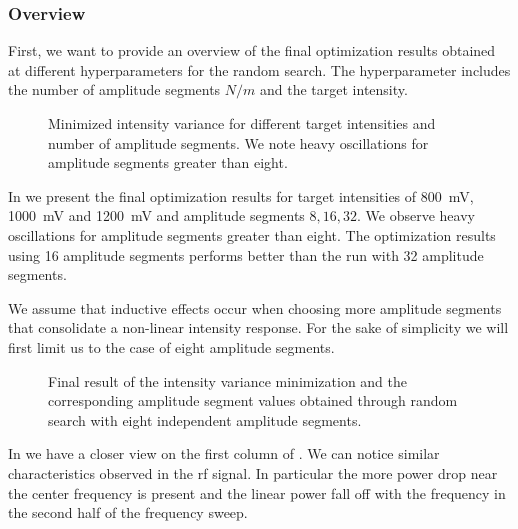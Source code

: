 \subsubsection{Overview}

First, we want to provide an overview of the final optimization results
obtained at different hyperparameters for the random search. The
hyperparameter includes the number of amplitude segments $N/m$ and the target
intensity.
\begin{figure}[htb]
  \centering
  \begin{adjustbox}{width=\textwidth}
  \end{adjustbox}
  \caption{Minimized intensity variance for different target intensities
    and number of amplitude segments. We note heavy oscillations for
    amplitude segments greater than eight.
  }\label{fig:intensity_optimization_overview}
\end{figure}
In  we present the final
optimization results for target intensities of \SI{800}{\milli\volt},
\SI{1000}{\milli\volt} and \SI{1200}{\milli\volt} and amplitude segments
$8,16,32$. We observe heavy oscillations for amplitude segments greater than
eight. The optimization results using \num{16} amplitude segments performs
better than the run with \num{32} amplitude segments.

We assume that inductive effects occur when choosing more amplitude segments
that consolidate a non-linear intensity response. For the sake of simplicity
we will first limit us to the case of eight amplitude segments.
\begin{figure}[htb]
  \centering
  \begin{adjustbox}{width=\textwidth}
  \end{adjustbox}
  \caption{Final result of the intensity variance minimization and the
    corresponding amplitude segment values obtained through random search with
    eight independent amplitude segments.
  }\label{fig:intensity_optimization_intensity_amplitude}
\end{figure}
In  we have a closer
view on the first column of . We
can notice similar characteristics observed in the \gls{rf} signal. In
particular the more power drop near the center frequency is present and the
linear power fall off with the frequency in the second half of the frequency
sweep.

